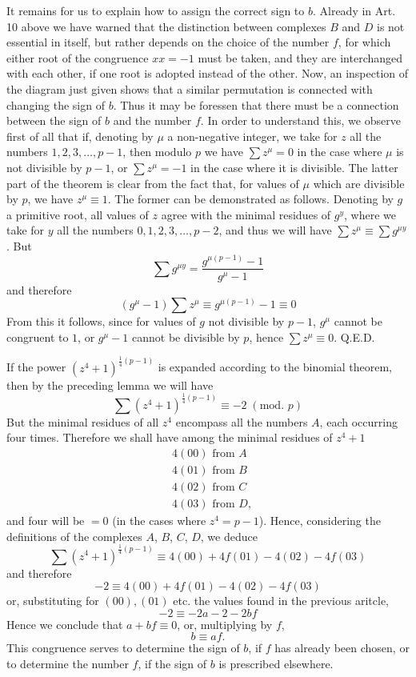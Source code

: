 \documentclass{book}
\theoremstyle{plain}
\theoremstyle{remark}
\begin{document}
It remains for us to explain how to assign the correct sign to $b$.  Already in Art. 10 above we have warned that the distinction between complexes $B$ and $D$ is not essential in itself, but rather depends on the choice of the number $f$, for which either root of the congruence $xx=-1$ must be taken, and they are interchanged with each other, if one root is adopted instead of the other.  Now, an inspection of the diagram just given shows that a similar permutation is connected with changing the sign of $b$.  Thus it may be foressen that there must be a connection between the sign of $b$ and the number $f$.  In order to understand this, we observe first of all that if, denoting by $\mu$ a non-negative integer, we take for $z$ all the numbers $1,2,3,\dots,p-1$, then modulo $p$ we have $\sum z^{\mu} = 0$ in the case where $\mu$ is not divisible by $p-1$, or $\sum z^{\mu} = -1$ in the case where it is divisible.  The latter part of the theorem is clear from the fact that, for values of $\mu$ which are divisible by $p$, we have $z^{\mu} \equiv 1$.  The former can be demonstrated as follows.  Denoting by $g$ a primitive root, all values of $z$ agree with the minimal residues of $g^y$, where we take for $y$ all the numbers $0,1,2,3,\dots,p-2$, and thus we will have $\sum z^{\mu} \equiv \sum g^{\mu y}$. But 
\[ \sum g^{\mu y} = \frac{g^{\mu(p-1)}-1}{g^\mu-1} \]
and therefore
\[ (g^\mu-1) \sum z^{\mu} \equiv g^{\mu(p-1)}-1 \equiv 0 \]
From this it follows, since for values of $g$ not divisible by $p-1$, $g^{\mu}$ cannot be congruent to $1$, or $g^{\mu} -1$ cannot be divisible by $p$, hence $\sum z^{\mu} \equiv 0$.  Q.E.D.

If the power $(z^4+1)^{\frac{1}{4}(p-1)}$ is expanded according to the binomial theorem, then by the preceding lemma we will have 
\[ \sum (z^4+1)^{\frac{1}{4}(p-1)} \equiv -2 \;(\textrm{mod. }p) \]
But the minimal residues of all $z^4$ encompass all the numbers $A$, each occurring four times.  Therefore we shall have among the minimal residues of $z^4+1$ 
\begin{align*}
 &4(00) \textrm{ from } A  \\
&4(01) \textrm{ from } B \\
&4(02) \textrm{ from } C \\
&4(03) \textrm{ from } D, 
\end{align*}
and four will be $=0$ (in the cases where $z^4 = p-1$).  Hence, considering the definitions of the complexes $A$, $B$, $C$, $D$, we deduce
\[ \sum (z^4+1)^{\frac{1}{4}(p-1)} \equiv 4 (00) + 4f(01)-4(02)-4f(03) \]
and therefore
\[ -2 \equiv 4(00)+4f(01)-4(02)-4f(03) \]
or, substituting for $(00), (01)$ etc. the values found in the previous aritcle, 
\[ -2 \equiv -2a-2-2bf \]
Hence we conclude that $a+bf \equiv 0$, or, multiplying by $f$,
\[ b \equiv af. \]
This congruence serves to determine the sign of $b$, if $f$ has already been chosen, or to determine the number $f$, if the sign of $b$ is prescribed elsewhere.
\end{document}
